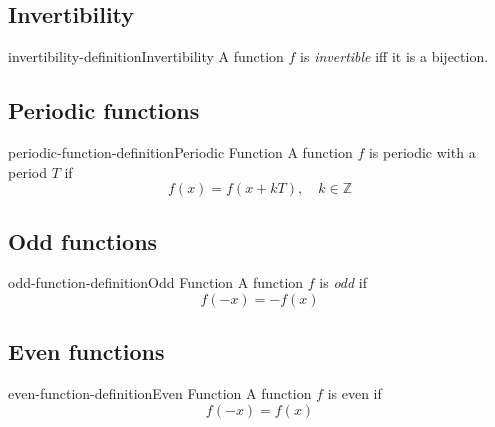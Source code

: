\documentclass[preview]{standalone}
\begin{document}
\subsection{Invertibility}

\begin{snippetdefinition}{invertibility-definition}{Invertibility}{
    A function \(f\) is \textit{invertible} iff it is a bijection.
}
\end{snippetdefinition}

\subsection{Periodic functions}

\begin{snippetdefinition}{periodic-function-definition}{Periodic Function}{
    A function \(f\) is periodic with a period \(T\) if
    \[
        f(x) = f(x + kT), \quad k \in \mathbb{Z}
    \]
}
\end{snippetdefinition}

\subsection{Odd functions}

\begin{snippetdefinition}{odd-function-definition}{Odd Function}{
    A function \(f\) is \textit{odd} if
    \[
        f(-x) = -f(x)
    \]
}
\end{snippetdefinition}

\subsection{Even functions}

\begin{snippetdefinition}{even-function-definition}{Even Function}{
    A function \(f\) is even if
    \[
        f(-x) = f(x)
    \]
}
\end{snippetdefinition}
\end{document}
